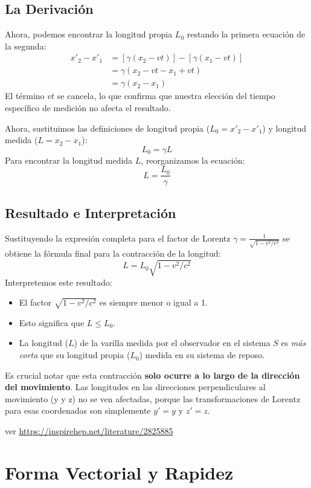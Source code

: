 \documentclass[11pt,a4paper]{article}
\begin{document}
\subsection{La Derivación}

Ahora, podemos encontrar la longitud propia $L_0$ restando la primera ecuación de la segunda:
\begin{align*}
x'_2 - x'_1 &= \left[ \gamma (x_2 - vt) \right] - \left[ \gamma (x_1 - vt) \right] \\
&= \gamma (x_2 - vt - x_1 + vt) \\
&= \gamma (x_2 - x_1)
\end{align*}
El término $vt$ se cancela, lo que confirma que nuestra elección del tiempo específico de medición no afecta el resultado.

Ahora, sustituimos las definiciones de longitud propia ($L_0 = x'_2 - x'_1$) y longitud medida ($L = x_2 - x_1$):
\[ L_0 = \gamma L \]
Para encontrar la longitud medida $L$, reorganizamos la ecuación:
\[ L = \frac{L_0}{\gamma} \]

\subsection{Resultado e Interpretación}

Sustituyendo la expresión completa para el factor de Lorentz $\gamma = \frac{1}{\sqrt{1-v^2/c^2}}$ se obtiene la fórmula final para la contracción de la longitud:
\[ \boxed{ L = L_0 \sqrt{1 - v^2/c^2} } \]
Interpretemos este resultado:
\begin{itemize}
    \item El factor $\sqrt{1 - v^2/c^2}$ es siempre menor o igual a 1.
    \item Esto significa que $L \le L_0$.
    \item La longitud ($L$) de la varilla medida por el observador en el sistema $S$ es \textit{más corta} que su longitud propia ($L_0$) medida en su sistema de reposo.
\end{itemize}
Es crucial notar que esta contracción \textbf{solo ocurre a lo largo de la dirección del movimiento}. Las longitudes en las direcciones perpendiculares al movimiento (y y z) no se ven afectadas, porque las transformaciones de Lorentz para esas coordenadas son simplemente $y' = y$ y $z' = z$.

ver \url{https://inspirehep.net/literature/2825885}

\section{Forma Vectorial y Rapidez}
\end{document}
